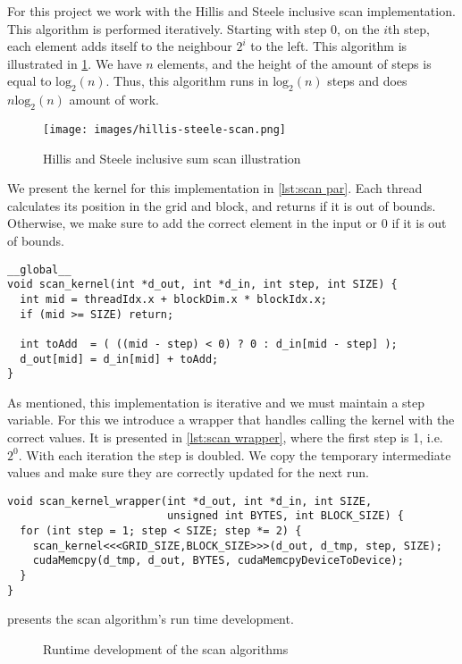 For this project we work with the Hillis and Steele inclusive scan implementation.
This algorithm is performed iteratively.
Starting with step 0, on the $i$th step, each element adds itself to the neighbour $2^i$ to the left.
This algorithm is illustrated in \cref{fig:hillis steele scan}.
We have $n$ elements, and the height of the amount of steps is equal to $\mathrm{log}_2(n)$.
Thus, this algorithm runs in $\mathrm{log}_2(n)$ steps and does $n \mathrm{log}_2(n)$ amount of work.

\begin{figure}[htb]
  \centering
  \texttt{[image: images/hillis-steele-scan.png]}
  \caption{Hillis and Steele inclusive sum scan illustration}
  \label{fig:hillis steele scan}
\end{figure}

We present the kernel for this implementation in \cref{lst:scan par}.
Each thread calculates its position in the grid and block, and returns if it is out of bounds.
Otherwise, we make sure to add the correct element in the input or 0 if it is out of bounds.

\begin{lstlisting}[caption={Hillis and Steele scan kernel}, label={lst:scan par}]
__global__
void scan_kernel(int *d_out, int *d_in, int step, int SIZE) {
  int mid = threadIdx.x + blockDim.x * blockIdx.x;
  if (mid >= SIZE) return;

  int toAdd  = ( ((mid - step) < 0) ? 0 : d_in[mid - step] );
  d_out[mid] = d_in[mid] + toAdd;
}
\end{lstlisting}

As mentioned, this implementation is iterative and we must maintain a step variable.
For this we introduce a wrapper that handles calling the kernel with the correct values.
It is presented in \cref{lst:scan wrapper}, where the first step is 1, i.e. $2^0$.
With each iteration the step is doubled.
We copy the temporary intermediate values and make sure they are correctly updated for the next run.

\begin{lstlisting}[caption={Hillis and Steele scan kernel wrapper}, label={lst:scan wrapper}]
void scan_kernel_wrapper(int *d_out, int *d_in, int SIZE, 
                         unsigned int BYTES, int BLOCK_SIZE) {
  for (int step = 1; step < SIZE; step *= 2) {
    scan_kernel<<<GRID_SIZE,BLOCK_SIZE>>>(d_out, d_tmp, step, SIZE);
    cudaMemcpy(d_tmp, d_out, BYTES, cudaMemcpyDeviceToDevice);
  }
}
\end{lstlisting}

 presents the scan algorithm's run time development.


\begin{figure}[htb]
  \centering
  
  \caption{Runtime development of the scan algorithms}
  \label{fig:scan plot}
\end{figure}%
